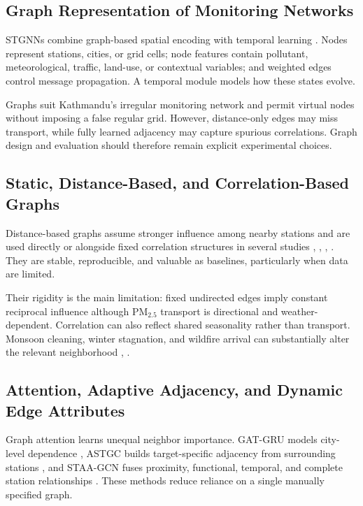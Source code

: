 \subsection{Graph Representation of Monitoring Networks}

STGNNs combine graph-based spatial encoding with temporal learning \cite{ref11}. Nodes represent stations, cities, or grid cells; node features contain pollutant, meteorological, traffic, land-use, or contextual variables; and weighted edges control message propagation. A temporal module models how these states evolve.

Graphs suit Kathmandu's irregular monitoring network and permit virtual nodes without imposing a false regular grid. However, distance-only edges may miss transport, while fully learned adjacency may capture spurious correlations. Graph design and evaluation should therefore remain explicit experimental choices.

\subsection{Static, Distance-Based, and Correlation-Based Graphs}

Distance-based graphs assume stronger influence among nearby stations and are used directly or alongside fixed correlation structures in several studies \cite{ref14}, \cite{ref18}, \cite{ref21}, \cite{ref23}. They are stable, reproducible, and valuable as baselines, particularly when data are limited.

Their rigidity is the main limitation: fixed undirected edges imply constant reciprocal influence although PM$_{2.5}$ transport is directional and weather-dependent. Correlation can also reflect shared seasonality rather than transport. Monsoon cleaning, winter stagnation, and wildfire arrival can substantially alter the relevant neighborhood \cite{ref5,ref6,ref7,ref8,ref9,ref10}, \cite{ref15}.

\subsection{Attention, Adaptive Adjacency, and Dynamic Edge Attributes}

Graph attention learns unequal neighbor importance. GAT-GRU models city-level dependence \cite{ref13}, ASTGC builds target-specific adjacency from surrounding stations \cite{ref26}, and STAA-GCN fuses proximity, functional, temporal, and complete station relationships \cite{ref34}. These methods reduce reliance on a single manually specified graph.

